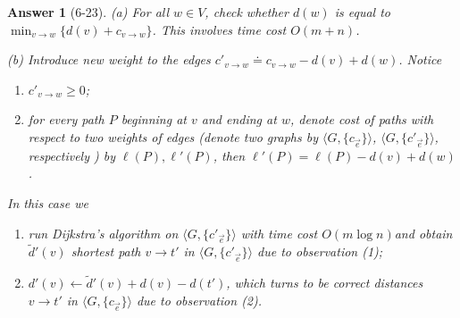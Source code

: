 \documentclass[11pt]{article}
\theoremstyle{numberplain}
\theoremstyle{nonumberplain}
\newtheorem{ans}{Answer}
\newcommand{\dps}{\displaystyle}
\newcommand{\0}{{\mathbf{0}}}
\begin{document}
\begin{ans}[6-23] 
(a) For all $w\in V$, check whether $d(w)$ is equal to $\dps \min_{v\rightarrow w}\{d(v)+c_{v\rightarrow w}\}$. This involves time cost $O(m+n)$.\par
(b)
Introduce new weight to the edges $c'_{v\rightarrow w }\doteq c_{v\rightarrow w}-d(v)+d(w)$. Notice
\begin{enumerate}
\item $c'_{v\rightarrow w}\geq 0$;
\item for every path $P$ beginning at $v$ and ending at $w$, denote cost of paths with respect to two weights of edges (denote two graphs by $\langle G,\{c_{\vec{e}}\}\rangle $, $\langle G,\{c'_{\vec{e}}\}\rangle $, respectively ) by $\ell(P),\ell'(P)$, then $\ell'(P)=\ell(P)-d(v)+d(w)$.
\end{enumerate}
In this case we 
\begin{enumerate}
\item run Dijkstra's algorithm on $\langle G,\{c'_{\vec{e}}\}\rangle$ with time cost $O(m\log n)$and obtain $\tilde{d}'(v)$ shortest path $v\rightarrow t'$ in $\langle G,\{c'_{\vec{e}}\}\rangle $ due to observation (1);
\item $d'(v)\leftarrow \tilde{d}'(v)+d(v)-d(t')$, which turns to be correct distances $v\rightarrow t'$ in $\langle G,\{c_{\vec{e}}\}\rangle$ due to observation (2).
\end{enumerate}
\end{ans}
\end{document}
